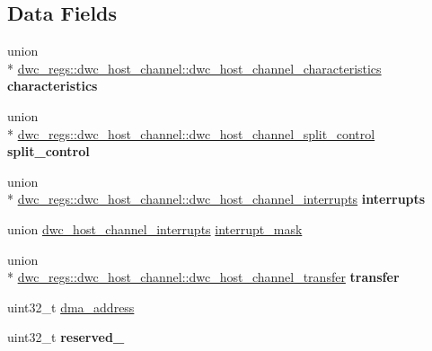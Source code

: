 \subsection*{Data Fields}
\begin{DoxyCompactItemize}
\item 
\hypertarget{structdwc__regs_1_1dwc__host__channel_a7a5d65f368b7c411de0feeff773b16a3}{union \\*
\hyperlink{uniondwc__regs_1_1dwc__host__channel_1_1dwc__host__channel__characteristics}{dwc\-\_\-regs\-::dwc\-\_\-host\-\_\-channel\-::dwc\-\_\-host\-\_\-channel\-\_\-characteristics} {\bfseries characteristics}}\label{structdwc__regs_1_1dwc__host__channel_a7a5d65f368b7c411de0feeff773b16a3}

\item 
\hypertarget{structdwc__regs_1_1dwc__host__channel_ae514373a263b188d2bfdff6f20119cb5}{union \\*
\hyperlink{uniondwc__regs_1_1dwc__host__channel_1_1dwc__host__channel__split__control}{dwc\-\_\-regs\-::dwc\-\_\-host\-\_\-channel\-::dwc\-\_\-host\-\_\-channel\-\_\-split\-\_\-control} {\bfseries split\-\_\-control}}\label{structdwc__regs_1_1dwc__host__channel_ae514373a263b188d2bfdff6f20119cb5}

\item 
\hypertarget{structdwc__regs_1_1dwc__host__channel_a9e3e1d846c0716e4adc473e08dfc0d46}{union \\*
\hyperlink{uniondwc__regs_1_1dwc__host__channel_1_1dwc__host__channel__interrupts}{dwc\-\_\-regs\-::dwc\-\_\-host\-\_\-channel\-::dwc\-\_\-host\-\_\-channel\-\_\-interrupts} {\bfseries interrupts}}\label{structdwc__regs_1_1dwc__host__channel_a9e3e1d846c0716e4adc473e08dfc0d46}

\item 
union \hyperlink{uniondwc__regs_1_1dwc__host__channel_1_1dwc__host__channel__interrupts}{dwc\-\_\-host\-\_\-channel\-\_\-interrupts} \hyperlink{structdwc__regs_1_1dwc__host__channel_a78409680286365a55da4dce096730c4b}{interrupt\-\_\-mask}
\item 
\hypertarget{structdwc__regs_1_1dwc__host__channel_a611fc01627213aa33d2c7f1aad698c8e}{union \\*
\hyperlink{uniondwc__regs_1_1dwc__host__channel_1_1dwc__host__channel__transfer}{dwc\-\_\-regs\-::dwc\-\_\-host\-\_\-channel\-::dwc\-\_\-host\-\_\-channel\-\_\-transfer} {\bfseries transfer}}\label{structdwc__regs_1_1dwc__host__channel_a611fc01627213aa33d2c7f1aad698c8e}

\item 
uint32\-\_\-t \hyperlink{structdwc__regs_1_1dwc__host__channel_a2c8460c60568d37d2019340802d34637}{dma\-\_\-address}
\item 
\hypertarget{structdwc__regs_1_1dwc__host__channel_a29c952f465f597f14e188bca17dc7de4}{uint32\-\_\-t {\bfseries reserved\-\_}}\label{structdwc__regs_1_1dwc__host__channel_a29c952f465f597f14e188bca17dc7de4}


\end{DoxyCompactItemize}
